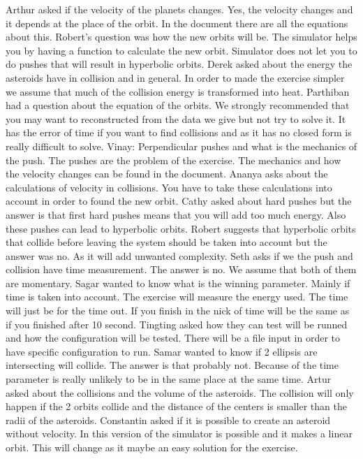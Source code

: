 Arthur asked if the velocity of the planets changes.
Yes, the velocity changes and it depends at the place of the orbit. In the document there are all the equations about this.
Robert’s question was how the new orbits will be.
The simulator helps you by having a function to calculate the new orbit. Simulator does not let you to do pushes that will result in hyperbolic orbits.
Derek asked about the energy the asteroids have in collision and in general.
In order to made the exercise simpler we assume that much of the collision energy is transformed into heat. 
Parthiban had a question about the equation of the orbits. We strongly recommended that you may want to reconstructed from the data we give but not try to solve it. It has the error of time if you want to find collisions and as it has no closed form is really difficult to solve.
Vinay: Perpendicular pushes and what is the mechanics of the push.
The pushes are the problem of the exercise. The mechanics and how the velocity changes can be found in the document.
Ananya asks about the calculations of velocity in collisions. You have to take these calculations into account in order to found the new orbit.
Cathy asked about hard pushes but the answer is that first hard pushes means that you will add too much energy. Also these pushes can lead to hyperbolic orbits.
Robert suggests that hyperbolic orbits that collide before leaving the system should be taken into account but the answer was no. As it will add unwanted complexity.
Seth asks if we the push and collision have time measurement. The answer is no. We assume that both of them are momentary. 
Sagar wanted to know what is the winning parameter. Mainly if time is taken into account. The exercise will measure the energy used. The time will just be for the time out. If you finish in the nick of time will be the same as if you finished after 10 second. 
Tingting asked how they can test will be runned and how the configuration will be tested. There will be a file input in order to have specific configuration to run.
Samar wanted to know if 2 ellipsis are intersecting will collide. The answer is that probably not. Because of the time parameter is really unlikely to be in the same place at the same time.
Artur asked about the collisions and the volume of the asteroids. The collision will only happen if the 2 orbits collide and the distance of the centers is smaller than the radii of the asteroids.
Constantin asked if it is possible to create an asteroid without velocity. In this version of the simulator is possible and it makes a linear orbit. This will change as it maybe an easy solution for the exercise.
